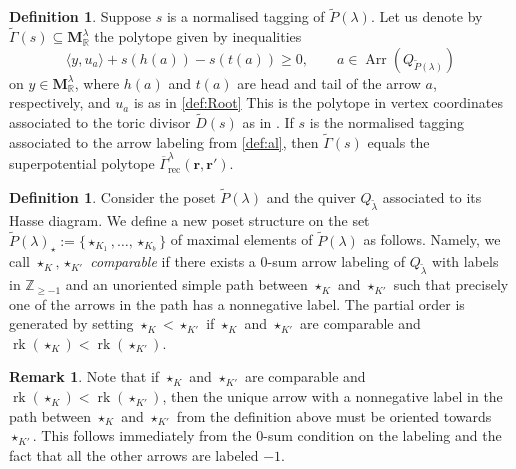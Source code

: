 \documentclass{amsart}
\theoremstyle{definition}
\newtheorem{defn}[thm]{Definition}
\newtheorem{remark}[thm]{Remark}
\numberwithin{equation}{section}
\newcommand{\rk}{\operatorname{rk}}
\newcommand{\Arr}{\operatorname{Arr}}
\newcommand{\R}{\mathbb R}
\newcommand{\rect}{\mathrm{rec}}
\newcommand{\Z}{\mathbb{Z}}
\begin{document}
\begin{defn}\label{d:Gammatilde}
	Suppose $s$ is a normalised tagging of $\widetilde P(\lambda)$. Let us denote by $\widetilde\Gamma(s) \subseteq \mathbf M^{\lambda}_\R$ the polytope  given by inequalities 
\begin{equation}\label{e:momentineqY}
\langle y,u_a\rangle + s(h(a))-s(t(a))\ge 0, \qquad a\in \Arr(Q_{\widetilde P(\lambda)})
\end{equation} 
	on $y\in\mathbf M^\lambda_\R$, where $h(a)$ and $t(a)$ are head and tail of the arrow $a$, respectively, and $u_a$ is as in \cref{def:Root} 
	This is the polytope in vertex coordinates associated to the toric  divisor $\widetilde D(s)$ as in \cite[Section 4.3]{CLS}. If $s$ is the normalised tagging associated to the arrow labeling 
	from \cref{def:al}, then $\widetilde\Gamma(s)$ equals the superpotential
	polytope $\overline{\Gamma}^\lambda_\rect(\mathbf r,\mathbf r')$.  
\end{defn}
\begin{defn}\label{d:nef} 
Consider the poset $\widetilde P(\lambda)$ and the quiver $Q_{\widetilde \lambda}$ associated to its Hasse diagram. 
	We define a new poset structure on the set $\widetilde P(\lambda)_\star:=\{\star_{K_1},\dotsc, \star_{K_b}\}$ of maximal elements of $\widetilde P(\lambda)$ as follows. Namely, we call $\star_K, \star_{K'}$  \textit{comparable} if there exists a $0$-sum arrow labeling of $Q_{\widetilde\lambda}$ with labels in $\Z_{\ge -1}$ and an unoriented simple path between $\star_K$ and $\star_{K'}$ such that precisely one of the arrows in the path has a nonnegative label. The partial order is generated by setting $\star_K<\star_{K'}$ if $\star_K$ and $\star_{K'}$ are comparable and $\rk(\star_K)< \rk(\star_{K'})$.

\end{defn}
\begin{remark}\label{r:PosArrow}
Note that if $\star_K$ and $\star_{K'}$ are comparable and $\rk(\star_K)<\rk(\star_{K'})$, then the unique arrow with a nonnegative label in the path between $\star_K$ and $\star_{K'}$ from the definition above must be oriented towards $\star_{K'}$. This follows immediately from the $0$-sum condition on the labeling and the fact that all the other arrows are labeled $-1$. 
\end{remark}
\end{document}
